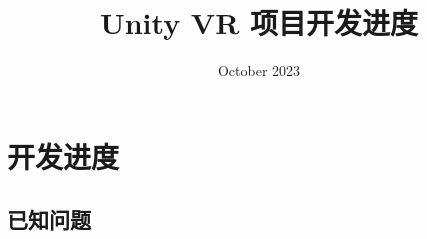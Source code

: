\documentclass[a4paper,10pt]{article}
\begin{document}
	
	
	\title{\songti {}Unity VR 项目开发进度}
	\date{\textrm{October 2023}}
	\maketitle
	
	\renewcommand{\figurename}{Figure} %
	\renewcommand{\contentsname}{Contents}
	\renewcommand{\tablename}{Table}
	\tableofcontents  %
		
	\section{开发进度}
		
		\subsection{已知问题}
		
\end{document}
